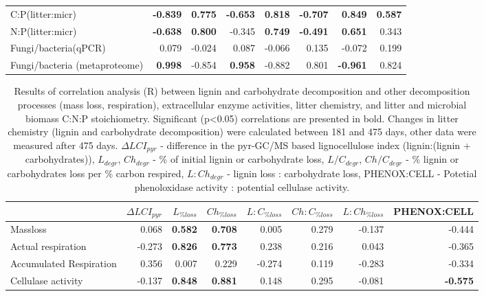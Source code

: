 \documentclass[10pt]{article}
\begin{document}
\begin{flushleft}
\begin{landscape}
\begin{table}[h!]
{\begin{tabular}{lrrrrrrr}
  C:P(litter:micr) & \textbf{ -0.839 } & \textbf{ 0.775 } & \textbf{ -0.653 } & \textbf{ 0.818 } & \textbf{ -0.707 } & \textbf{ 0.849 } & \textbf{ 0.587 } \\ 
  N:P(litter:micr) & \textbf{ -0.638 } & \textbf{ 0.800 } & -0.345 & \textbf{ 0.749 } & \textbf{ -0.491 } & \textbf{ 0.651 } & 0.343 \\ 
  Fungi/bacteria(qPCR) & 0.079 & -0.024 & 0.087 & -0.066 & 0.135 & -0.072 & 0.199 \\ 
  Fungi/bacteria (metaproteome) & \textbf{ 0.998 } & -0.854 & \textbf{ 0.958 } & -0.882 & 0.801 & \textbf{ -0.961 } & 0.824 \\ 
   \hline
\end{tabular}
}
\end{table}


\newpage
\begin{table}[h!]
\centering
\caption{Results of correlation analysis (R) between lignin and carbohydrate decomposition and other decomposition processes (mass loss, respiration), extracellular enzyme activities, litter chemistry, and litter and microbial biomass C:N:P stoichiometry. Significant (p\textless 0.05) correlations are presented in bold. Changes in litter chemistry (lignin and carbohydrate decomposition) were calculated between 181 and 475 days, other data were measured after 475 days. $\Delta LCI_{pyr}$ - difference in the pyr-GC/MS based lignocellulose index (lignin:(lignin + carbohydrates)), $L_{degr}$, $Ch_{degr}$ - \% of initial lignin or carbohydrate loss, $L/C_{degr}$, $Ch/C_{degr}$  - \% lignin or carbohydrates loss per \% carbon respired, $L:Ch_{degr}$ - lignin loss : carbohydrate loss, PHENOX:CELL - Potetial phenoloxidase activity : potential cellulase activity.} 
\label{corrtable2}
{\small
\begin{tabular}{lrrrrrrr}
  \hline
 & $\Delta LCI_{pyr}$ & $L_{\%loss}$ & $Ch_{\%loss}$ & $L:C_{\%loss}$ & $Ch:C_{\%loss}$ & $L:Ch_{\%loss}$ & PHENOX:CELL \\ 
  \hline
Massloss & 0.068 & \textbf{ 0.582 } & \textbf{ 0.708 } & 0.005 & 0.279 & -0.137 & -0.444 \\ 
  Actual respiration & -0.273 & \textbf{ 0.826 } & \textbf{ 0.773 } & 0.238 & 0.216 & 0.043 & -0.365 \\ 
  Accumulated Respiration & 0.356 & 0.007 & 0.229 & -0.274 & 0.119 & -0.283 & -0.334 \\ 
  Cellulase activity & -0.137 & \textbf{ 0.848 } & \textbf{ 0.881 } & 0.148 & 0.295 & -0.081 & \textbf{ -0.575 } \\ 

\end{tabular}}
\end{table}
\end{landscape}
\end{flushleft}
\end{document}
